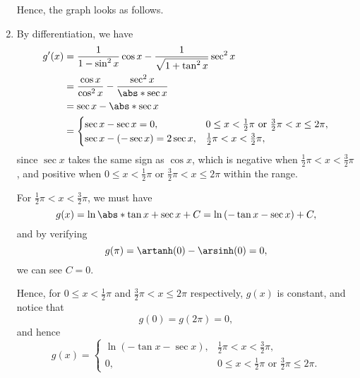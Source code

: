 \begin{enumerate}
          Hence, the graph looks as follows.

          \begin{center}
              
          \end{center}

    \item By differentiation, we have
          \begin{align*}
              g'(x) & = \frac{1}{1 - \sin^2 x} \cos x - \frac{1}{\sqrt{1 + \tan^2 x}} \sec^2 x                                 \\
                    & = \frac{\cos x}{\cos^2 x} - \frac{\sec^2 x}{\abs*{\sec x}}                                               \\
                    & = \sec x - \abs*{\sec x}                                                                                 \\
                    & = \begin{cases}
                            \sec x - \sec x = 0,            & 0 \leq x < \frac{1}{2}\pi \text{ or } \frac{3}{2} \pi < x \leq 2\pi, \\
                            \sec x - (- \sec x) = 2 \sec x, & \frac{1}{2}\pi < x < \frac{3}{2}\pi,
                        \end{cases}
          \end{align*}
          since \(\sec x\) takes the same sign as \(\cos x\), which is negative when \(\frac{1}{2}\pi < x < \frac{3}{2}\pi\), and positive when \(0 \leq x < \frac{1}{2}\pi\) or \(\frac{3}{2} \pi < x \leq 2\pi\) within the range.

          For \(\frac{1}{2} \pi < x < \frac{3}{2}\pi\), we must have
          \[
              g(x) = \ln \abs*{\tan x + \sec x} + C = \ln \left(- \tan x - \sec x\right) + C,
          \]
          and by verifying
          \[
              g(\pi) = \artanh (0) - \arsinh (0) = 0,
          \]
          we can see \(C = 0\).

          Hence, for \(0 \leq x < \frac{1}{2}\pi\) and \(\frac{3}{2} \pi < x \leq 2\pi\) respectively, \(g(x)\) is constant, and notice that
          \[
              g(0) = g(2\pi) = 0,
          \]
          and hence
          \[
              g(x) = \begin{cases}
                  \ln \left(- \tan x - \sec x\right), & \frac{1}{2} \pi < x < \frac{3}{2}\pi,                            \\
                  0,                                  & 0 \leq x < \frac{1}{2}\pi \text{ or } \frac{3}{2} \pi \leq 2\pi.
              \end{cases}
          \]

          \begin{center}
              
          \end{center}
\end{enumerate}